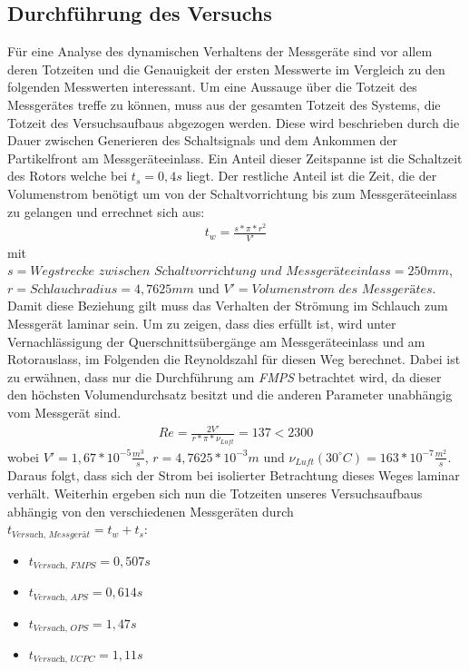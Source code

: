 \subsection{Durchf\"{u}hrung des Versuchs}
F\"{u}r eine Analyse des dynamischen Verhaltens der Messger\"{a}te sind vor allem deren Totzeiten und die Genauigkeit der ersten Messwerte im Vergleich zu den folgenden Messwerten interessant. Um eine Aussauge \"{u}ber die Totzeit des Messger\"{a}tes treffe zu k\"{o}nnen, muss aus der gesamten Totzeit des Systems, die Totzeit des Versuchsaufbaus abgezogen werden. Diese wird beschrieben durch die Dauer zwischen Generieren des Schaltsignals und dem Ankommen der Partikelfront am Messger\"{a}teeinlass. Ein Anteil dieser Zeitspanne ist die Schaltzeit des Rotors welche bei \(t_s = 0,4 s\) liegt. Der restliche Anteil ist die Zeit, die der Volumenstrom ben\"{o}tigt um von der Schaltvorrichtung bis zum Messger\"{a}teeinlass zu gelangen und errechnet sich aus:
\begin{align*}
t_w = \frac{s * \pi * r^2}{V'}
\end{align*} 
mit \(s = \textit{Wegstrecke zwischen Schaltvorrichtung und Messger\"{a}teeinlass} = 250 mm\), \(r = \textit{Schlauchradius} = 4,7625 mm\) und \(V' = \textit{Volumenstrom des Messger\"{a}tes}\).\\
Damit diese Beziehung gilt muss das Verhalten der Str\"{o}mung im Schlauch zum Messger\"{a}t laminar sein. Um zu zeigen, dass dies erf\"{u}llt ist, wird unter Vernachl\"{a}ssigung der Querschnitts\"{u}berg\"{a}nge am Messger\"{a}teeinlass und am Rotorauslass, im Folgenden die Reynoldszahl f\"{u}r diesen Weg berechnet. Dabei ist zu erw\"{a}hnen, dass nur die Durchf\"{u}hrung am \textit{FMPS} betrachtet wird, da dieser den h\"{o}chsten Volumendurchsatz besitzt und die anderen Parameter unabh\"{a}ngig vom Messger\"{a}t sind.
\begin{align*}
Re = \frac{2V'}{r * \pi * \nu_\textit{Luft}} = 137 < 2300
\end{align*}
wobei \(V' = 1,67*10^{-5}\frac{m^3}{s}\), \(r = 4,7625 * 10^{-3}m\) und \(\nu_\textit{Luft}(30^\circ C) = 163 * 10^{-7} \frac{m^2}{s}\).
Daraus folgt, dass sich der Strom bei isolierter Betrachtung dieses Weges laminar verh\"{a}lt. Weiterhin ergeben sich nun die Totzeiten unseres Versuchsaufbaus abh\"{a}ngig von den verschiedenen Messger\"{a}ten durch\\
\(t_\textit{Versuch, Messger\"{a}t} = t_w + t_s\):
\begin{itemize}
	\item \(t_\textit{Versuch, FMPS} = 0,507s\)
	\item \(t_\textit{Versuch, APS} = 0,614s\)
	\item \(t_\textit{Versuch, OPS} = 1,47s\)
	\item \(t_\textit{Versuch, UCPC} = 1,11s\)
\end{itemize}
